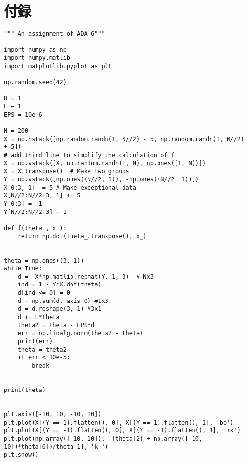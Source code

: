 \documentclass[9pt]{ltjsarticle}
\begin{document}
\section*{付録}
\tiny
\begin{verbatim}
""" An assignment of ADA 6"""

import numpy as np
import numpy.matlib
import matplotlib.pyplot as plt

np.random.seed(42)

H = 1
L = 1
EPS = 10e-6

N = 200
X = np.hstack([np.random.randn(1, N//2) - 5, np.random.randn(1, N//2) + 5])
# add third line to simplify the calculation of f.
X = np.vstack([X, np.random.randn(1, N), np.ones((1, N))])
X = X.transpose()  # Make two groups
Y = np.vstack([np.ones((N//2, 1)), -np.ones((N//2, 1))])
X[0:3, 1] -= 5 # Make exceptional data
X[N//2:N//2+3, 1] += 5
Y[0:3] = -1
Y[N//2:N//2+3] = 1

def f(theta_, x_):
    return np.dot(theta_.transpose(), x_)


theta = np.ones((3, 1))
while True:
    d = -X*np.matlib.repmat(Y, 1, 3)  # Nx3
    ind = 1 - Y*X.dot(theta)
    d[ind <= 0] = 0
    d = np.sum(d, axis=0) #1x3
    d = d.reshape(3, 1) #3x1
    d += L*theta
    theta2 = theta - EPS*d
    err = np.linalg.norm(theta2 - theta)
    print(err)
    theta = theta2
    if err < 10e-5:
        break


print(theta)        


plt.axis([-10, 10, -10, 10])
plt.plot(X[(Y == 1).flatten(), 0], X[(Y == 1).flatten(), 1], 'bo')
plt.plot(X[(Y == -1).flatten(), 0], X[(Y == -1).flatten(), 1], 'rx')
plt.plot(np.array([-10, 10]), -(theta[2] + np.array([-10, 10])*theta[0])/theta[1], 'k-')
plt.show()
\end{verbatim}
\end{document}
